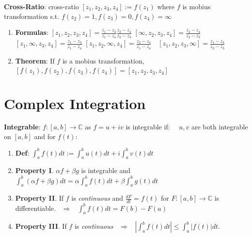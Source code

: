 \documentclass[9pt]{article}
\begin{document}
\textbf{Cross-Ratio}: cross-ratio $[z_1,z_2,z_3,z_4]:=f(z_1)$ where $f$ is mobius transformation s.t. $f(z_2)=1,f(z_3)=0,f(z_4)=\infty$

\begin{enumerate}[itemsep=-2pt, topsep=-2pt]
    \item \textbf{Formulas}: {\footnotesize $[z_1,z_2,z_3,z_4]=\frac{z_1-z_3}{z_1-z_4}\frac{z_2-z_4}{z_2-z_3}$ \quad $[\infty,z_2,z_3,z_4]=\frac{z_2-z_4}{z_2-z_3}$ \quad $[z_1,\infty,z_3,z_4]=\frac{z_1-z_3}{z_1-z_4}$ \quad $[z_1,z_2,\infty,z_4]=\frac{z_2-z_4}{z_1-z_4} \quad [z_1,z_2,z_3,\infty]=\frac{z_1-z_3}{z_2-z_3}$}
    \item \textbf{Theorem}: If $f$ is a mobius transformation, $[f(z_1),f(z_2),f(z_3),f(z_4)]=[z_1,z_2,z_3,z_4]$ \qquad {}
\end{enumerate}


\section{Complex Integration} %

\textbf{Integrable}: $f:[a,b]\to \mathbb{C}$ as $f=u+iv$ is integrable if: \ \ $u,v$ are both integrable on $[a,b]$ and for $f(t)$:

\begin{enumerate}[itemsep=-2pt, topsep=-2pt]
    \item \textbf{Def}: $\int_a^b f(t)dt:=\int_a^b u(t)dt+i\int_a^b v(t)dt$
    \item \textbf{Property I}. $\alpha f+\beta g$ is integrable and $\int_a^b(\alpha f+\beta g)dt=\alpha\int_a^b f(t)dt+\beta\int_a^b g(t)dt$
    \item \textbf{Property II}. If $f$ is \textit{continuous} and $\frac{dF}{dt}=f(t)$ for $F:[a,b]\to\mathbb{C}$ is differentiable. \ $\Rightarrow$ \ $\int_a^b f(t)dt=F(b)-F(a)$
    \item \textbf{Property III}. If $f$ is \textit{continuous} \ $\Rightarrow$ \ $\left|\int_a^b f(t)dt\right|\leq\int_a^b|f(t)|dt$.
\end{enumerate}
\end{document}
